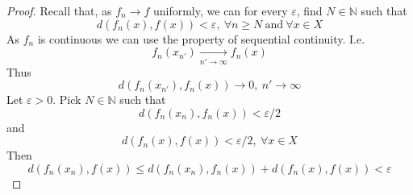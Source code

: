 \begin{proof}
    Recall that, as $f_n \to f$ uniformly, we can for every 
    $\varepsilon$, find $N \in \mathbb N$ such that 
    \[
        d(f_n(x),f(x)) < \varepsilon, \: \forall n \geq N \ 
        \text{and} \ \forall x \in X
    \]
    As $f_n$ is continuous we can use the property of sequential 
    continuity. I.e. 
    \[
        f_n(x_{n'}) \underset{n' \to \infty}{\to} f_n(x) 
    \]
    Thus
    \[
        d(f_n(x_{n'}), f_n(x)) \to 0, \: n' \to \infty
    \]
    Let $\varepsilon > 0$.
    Pick $N \in \mathbb N$ such that 
    \[
        d(f_n(x_n), f_n(x)) < \varepsilon/2
    \]
    and 
    \[
        d(f_n(x), f(x)) < \varepsilon/2, \: \forall x \in X 
    \]
    Then 
    \[
        d(f_n(x_n), f(x)) \leq 
        d(f_n(x_n), f_n(x)) + d(f_n(x), f(x)) 
        < \varepsilon
    \]
\end{proof}

